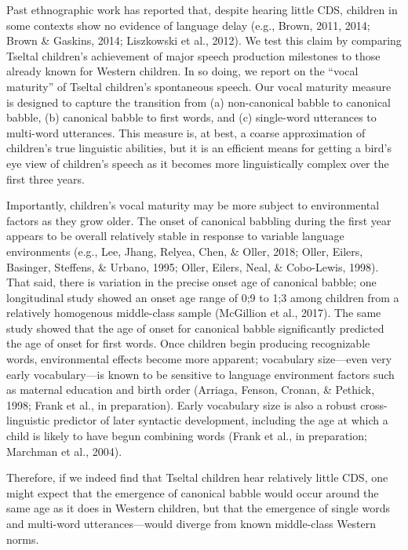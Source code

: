 \documentclass[floatsintext,man]{apa6}
\theoremstyle{definition}
\theoremstyle{definition}
\theoremstyle{definition}
\theoremstyle{remark}
\begin{document}
Past ethnographic work has reported that, despite hearing little CDS,
children in some contexts show no evidence of language delay (e.g.,
Brown, 2011, 2014; Brown \& Gaskins, 2014; Liszkowski et al., 2012). We
test this claim by comparing Tseltal children's achievement of major
speech production milestones to those already known for Western
children. In so doing, we report on the \enquote{vocal maturity} of
Tseltal children's spontaneous speech. Our vocal maturity measure is
designed to capture the transition from (a) non-canonical babble to
canonical babble, (b) canonical babble to first words, and (c)
single-word utterances to multi-word utterances. This measure is, at
best, a coarse approximation of children's true linguistic abilities,
but it is an efficient means for getting a bird's eye view of children's
speech as it becomes more linguistically complex over the first three
years.

Importantly, children's vocal maturity may be more subject to
environmental factors as they grow older. The onset of canonical
babbling during the first year appears to be overall relatively stable
in response to variable language environments (e.g., Lee, Jhang, Relyea,
Chen, \& Oller, 2018; Oller, Eilers, Basinger, Steffens, \& Urbano,
1995; Oller, Eilers, Neal, \& Cobo-Lewis, 1998). That said, there is
variation in the precise onset age of canonical babble; one longitudinal
study showed an onset age range of 0;9 to 1;3 among children from a
relatively homogenous middle-class sample (McGillion et al., 2017). The
same study showed that the age of onset for canonical babble
significantly predicted the age of onset for first words. Once children
begin producing recognizable words, environmental effects become more
apparent; vocabulary size---even very early vocabulary---is known to be
sensitive to language environment factors such as maternal education and
birth order (Arriaga, Fenson, Cronan, \& Pethick, 1998; Frank et al., in
preparation). Early vocabulary size is also a robust cross-linguistic
predictor of later syntactic development, including the age at which a
child is likely to have begun combining words (Frank et al., in
preparation; Marchman et al., 2004).

Therefore, if we indeed find that Tseltal children hear relatively
little CDS, one might expect that the emergence of canonical babble
would occur around the same age as it does in Western children, but that
the emergence of single words and multi-word utterances---would diverge
from known middle-class Western norms.
\end{document}
